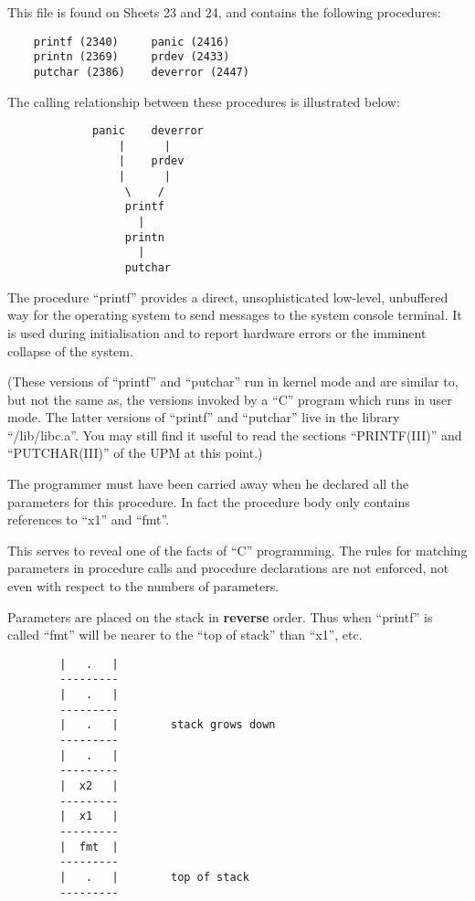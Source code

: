 This file is found on Sheets 23 and 24,
and contains the following procedures:

\begin{verbatim}
    printf (2340)     panic (2416)
    printn (2369)     prdev (2433)
    putchar (2386)    deverror (2447)
\end{verbatim}

The calling relationship between these
procedures is illustrated below:

\newpage
\begin{verbatim}
             panic    deverror
                 |      |
                 |    prdev
                 |      |
                  \    /
                  printf
                    |
                  printn
                    |
                  putchar
\end{verbatim}


The procedure ``printf'' provides a
direct, unsophisticated low-level,
unbuffered way for the operating system
to send messages to the system console
terminal. It is used during initialisation and to report hardware errors or
the imminent collapse of the system.


(These versions of ``printf'' and
``putchar'' run in kernel mode and are
similar to, but not the same as, the
versions invoked by a ``C'' program which
runs in user mode. The latter versions
of ``printf'' and ``putchar'' live in the
library ``/lib/libc.a''. You may still
find it useful to read the sections
``PRINTF(III)'' and ``PUTCHAR(III)'' of the
UPM at this point.)


\bd
\item[2340:] The programmer must have been
 carried away when he declared all
 the parameters for this procedure. In fact the procedure
 body only contains references to
 ``x1'' and ``fmt''.
\ed


This serves to reveal one of the facts
of ``C'' programming. The rules for
matching parameters in procedure calls
and procedure declarations are not
enforced, not even with respect to the
numbers of parameters.

Parameters are placed on the stack in
{\bf reverse} order. Thus when ``printf'' is
called ``fmt'' will be nearer to the ``top
of stack'' than ``x1'', etc.

\begin{verbatim}
        |   .   |
        ---------
        |   .   |
        ---------
        |   .   |        stack grows down
        ---------
        |   .   |
        ---------
        |  x2   |
        ---------
        |  x1   |
        ---------
        |  fmt  |
        ---------
        |   .   |        top of stack
        ---------
\end{verbatim}

